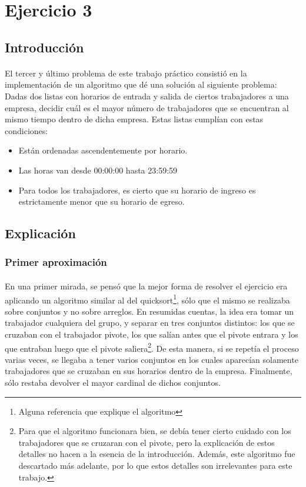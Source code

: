 \section{Ejercicio 3}

\subsection{Introducción}
\paragraph{}
El tercer y \'ultimo problema de este trabajo pr\'actico consistió en la implementación de un algoritmo que dé una solución al siguiente problema:\\
Dadas dos listas con horarios de entrada y salida de ciertos trabajadores a una empresa, decidir cu\'al es el mayor n\'umero de trabajadores que se encuentran al mismo tiempo dentro de dicha empresa. Estas listas cumplían con estas condiciones:
\begin{itemize}
	\item Están ordenadas ascendentemente por horario.
	\item Las horas van desde 00:00:00 hasta 23:59:59
	\item Para todos los trabajadores, es cierto que su horario de ingreso es estrictamente menor que su horario de egreso.
\end{itemize}



\subsection{Explicación}
\subsubsection{Primer aproximación}
\label{explicacion}

\paragraph{}
En una primer mirada, se pens\'o que la mejor forma de resolver el ejercicio era aplicando un algoritmo similar al del quicksort\footnote{Alguna referencia que explique el algoritmo}, s\'olo que el mismo se realizaba sobre conjuntos y no sobre arreglos. En resumidas cuentas, la idea era tomar un trabajador cualquiera del grupo, y separar en tres conjuntos distintos: los que se cruzaban con el trabajador pivote, los que sal\'ian antes que el pivote entrara y los que entraban luego que el pivote saliera\footnote{Para que el algoritmo funcionara bien, se deb\'ia tener cierto cuidado con los trabajadores que se cruzaran con el pivote, pero la explicaci\'on de estos detalles no hacen a la esencia de la introducci\'on. Adem\'as, este algoritmo fue descartado m\'as adelante, por lo que estos detalles son irrelevantes para este trabajo.}. De esta manera, si se repet\'ia el proceso varias veces, se llegaba a tener varios conjuntos en los cuales aparec\'ian solamente trabajadores que se cruzaban en sus horarios dentro de la empresa. Finalmente, s\'olo restaba devolver el mayor cardinal de dichos conjuntos.

